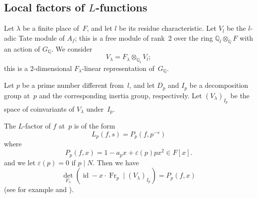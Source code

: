 \documentclass[11pt]{amsart}
\theoremstyle{definition}
\begin{document}
\subsection{Local factors of \texorpdfstring{$L$}{L}-functions}

		Let $\lambda$ be a finite place of~$F$, and let $l$ be its residue characteristic.  Let $V_l$ be the $l$-adic Tate module of $A_f$; this is a free module of rank~2 over the ring ${\mathbb{Q}}_l\otimes_{\mathbb{Q}} F$ with an action of $G_{\mathbb{Q}}$.  We consider
		$$V_\lambda = F_\lambda\otimes_{{\mathbb{Q}}_l} V_l;$$
		this is a $2$-dimensional $F_\lambda$-linear representation of~$G_{\mathbb{Q}}$.

		Let $p$ be a prime number different from~$l$, and let $D_p$ and $I_p$ be a decomposition group at~$p$ and the corresponding inertia group, respectively.  Let $(V_\lambda)_{I_p}$ be the space of coinvariants of $V_\lambda$ under~$I_p$.

		The $L$-factor of $f$ at~$p$ is of the form
		$$L_p(f,s) = P_p(f, p^{-s})$$
		where
		$$P_p(f, x) = 1 - a_p x + \varepsilon(p) p x^2 \in F[x].$$
		and we let $\varepsilon(p)=0$ if $p\mid N$.
		Then we have
		\begin{equation}
		\label{charpoly}
		\det_{F_\lambda}(\operatorname{id} - x\cdot\operatorname{Fr}_p \mid (V_\lambda)_{I_p}) = P_p(f,x)
		\end{equation}
		(see for example \cite[Theorem 4]{roh} and \cite{car86}).
\end{document}
